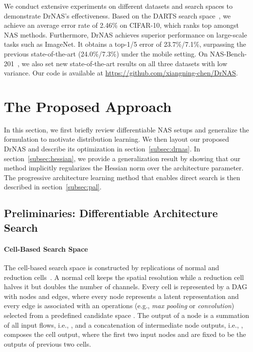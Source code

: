 \documentclass{article} \usepackage{iclr2021_conference,times}
\begin{document}
We conduct extensive experiments on different datasets and search spaces to demonstrate DrNAS's effectiveness. Based on the DARTS search space~\citep{darts}, we achieve an average error rate of 2.46\% on CIFAR-10, which ranks top amongst NAS methods.
Furthermore, DrNAS achieves superior performance on large-scale tasks such as ImageNet. It obtains a top-1/5 error of 23.7\%/7.1\%, surpassing the previous state-of-the-art (24.0\%/7.3\%) under the mobile setting.
On NAS-Bench-201~\citep{nasbench201}, we also set new state-of-the-art results on all three datasets with low variance.
Our code is available at \url{https://github.com/xiangning-chen/DrNAS}.


\section{The Proposed Approach}
In this section, we first briefly review differentiable NAS setups and generalize the formulation to motivate distribution learning.
We then layout our proposed DrNAS and describe its optimization in section~\ref{subsec:drnas}.
In section~\ref{subsec:hessian}, we provide a generalization result by showing that our method implicitly regularizes the Hessian norm over the architecture parameter.
The progressive architecture learning method that enables direct search is then described in section~\ref{subsec:pal}.

\subsection{Preliminaries: Differentiable Architecture Search}
\paragraph{Cell-Based Search Space}
The cell-based search space is constructed by replications of normal and reduction cells~\citep{nasnet,darts}.
A normal cell keeps the spatial resolution while a reduction cell halves it but doubles the number of channels.
Every cell is represented by a DAG with  nodes and  edges, where every node represents a latent representation  and every edge  is associated with an operations  (e.g., \textit{max pooling} or \textit{convolution}) selected from a predefined candidate space .
The output of a node is a summation of all input flows, i.e., , and a concatenation of intermediate node outputs, i.e., , composes the cell output, where the first two input nodes  and  are fixed to be the outputs of previous two cells.
\end{document}
